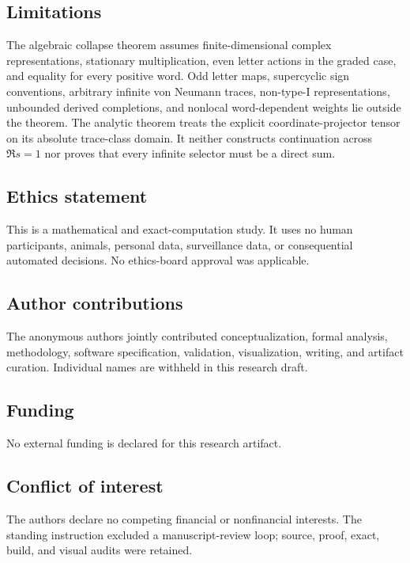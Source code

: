 \subsection{Limitations}

The algebraic collapse theorem assumes finite-dimensional complex
representations, stationary multiplication, even letter actions in the
graded case, and equality for every positive word.  Odd letter maps,
supercyclic sign conventions, arbitrary infinite von Neumann traces,
non-type-I representations, unbounded derived completions, and nonlocal
word-dependent weights lie outside the theorem.  The analytic theorem treats
the explicit coordinate-projector tensor on its absolute trace-class domain.
It neither constructs continuation across \(\Re s=1\) nor proves that every
infinite selector must be a direct sum.

\subsection{Ethics statement}

This is a mathematical and exact-computation study.  It uses no human
participants, animals, personal data, surveillance data, or consequential
automated decisions.  No ethics-board approval was applicable.

\subsection{Author contributions}

The anonymous authors jointly contributed conceptualization, formal analysis,
methodology, software specification, validation, visualization, writing, and
artifact curation.  Individual names are withheld in this research draft.

\subsection{Funding}

No external funding is declared for this research artifact.

\subsection{Conflict of interest}

\enlargethispage{3\baselineskip}
The authors declare no competing financial or nonfinancial interests.  The
standing instruction excluded a manuscript-review loop; source, proof, exact,
build, and visual audits were retained.

